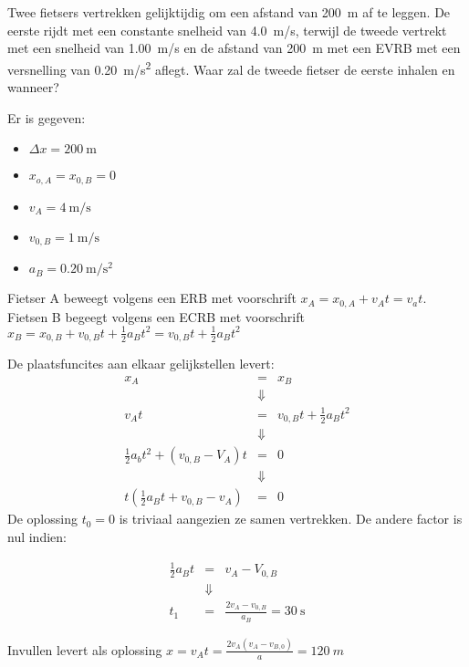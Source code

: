 \documentclass{ximera}
\begin{document}
\begin{exercise}
    Twee fietsers vertrekken gelijktijdig om een afstand van \SI{200}{m} af te leggen. De eerste rijdt met een constante snelheid van \SI{4,0}{m/s}, terwijl de tweede vertrekt met een snelheid van \SI{1,00}{m/s} en de afstand van \SI{200}{m} met een EVRB met een versnelling van \SI{0,20}{m/s^2} aflegt. Waar zal de tweede fietser de eerste inhalen en wanneer?
    \begin{oplossing}
    Er is gegeven: 
    \begin{itemize}
        \item \(\Delta x = \SI{200}{\meter}\)
        \item \(x_{o,A} = x_{0,B} = 0\)
        \item \(v_A = \SI{4}{\meter\per\second}\)
        \item \(v_{0,B} = \SI{1}{\meter\per\second}\)
        \item \(a_B = \SI{0,20}{\meter\per\second\squared}\)
    \end{itemize}

    Fietser A beweegt volgens een ERB met voorschrift \(x_A = x_{0,A} + v_A t = v_a  t\). \\

    Fietsen B begeegt volgens een ECRB met voorschrift \(x_B = x_{0,B} + v_{0,B} t + \frac{1}{2} a_B t^2 = v_{0,B} t + \frac{1}{2} a_B t^2 \)

    De plaatsfuncites aan elkaar gelijkstellen levert: 
    \[
    \begin{array}{rcl}
        x_A &=& x_B \\ 
        &\Downarrow& \\
        v_A t &=& v_{0,B}t + \frac{1}{2}a_B t^2\\
        &\Downarrow& \\
        \frac{1}{2}a_b t^2 + (v_{0,B} - V_A)t &=& 0 \\
        &\Downarrow& \\
        t\left( \frac{1}{2}a_Bt + v_{0,B} - v_A \right) &=& 0
    \end{array}
    \]
    De oplossing \(t_0 = 0\) is triviaal aangezien ze samen vertrekken. De andere factor is nul indien: 

    \[
    \begin{array}{rcl}
        \frac{1}{2}a_Bt&=& v_A-V_{0,B} \\
        &\Downarrow& \\
        t_1 &=& \frac{2{v_A - v_{0,B}}}{a_B} = \SI{30}{\second}
    \end{array}\]


    Invullen levert als oplossing $x=v_At=\frac{2v_A(v_A-v_{B,0})}{a}=\SI{120}{m}$
    \end{oplossing}

\end{exercise}
\end{document}
